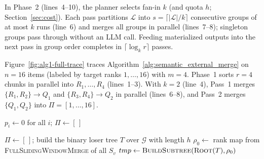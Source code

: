 In Phase~2 (lines~4--10), the planner selects fan-in $k$ (and quota $h$; Section~\ref{sec:cost}). Each pass partitions $\mathcal{L}$ into $s = \lceil |\mathcal{L}|/k \rceil$ consecutive groups of at most $k$ runs (line~6) and merges all groups in parallel (lines~7--8); singleton groups pass through without an LLM call. Feeding materialized outputs into the next pass in group order completes in $\lceil \log_k r \rceil$ passes.

\begin{example}\label{ex:alg1}
Figure~\ref{fig:alg1-full-trace} traces Algorithm~\ref{alg:semantic_external_merge} on $n{=}16$ items (labeled by target ranks $1,\dots,16$) with $m{=}4$. Phase~1 sorts $r{=}4$ chunks in parallel into $R_1,\dots,R_4$ (lines~1--3). With $k{=}2$ (line~4), Pass~1 merges $\{R_1,R_2\}\to Q_1$ and $\{R_3,R_4\}\to Q_2$ in parallel (lines~6--8), and Pass~2 merges $\{Q_1,Q_2\}$ into $\Pi=[1,\dots,16]$.
\end{example}

\suppressfloats[t]

\begin{algorithm}[t]
\caption{Sliding-Window Semantic $k$-Way Merge}
\label{alg:sliding_window_kway_group_merge}
$p_i\gets0$ for all $i$; $\Pi\gets[\,]$\;
\Return{$\Pi$}\;
\end{algorithm}

\begin{algorithm}[t]
\caption{Segmented Loser Tree Merge}
\label{alg:loser_tree_kway_group_merge}
$\Pi\gets[\,]$; build the binary loser tree $T$ over $\mathcal G$ with length $h$\;
$\rho_0\gets$ rank map from \textsc{FullSlidingWindowMerge} of all $S_v$\;
$tmp\gets\textsc{BuildSubtree}(\textsc{Root}(T),\rho_0)$\;
\Return{$\Pi$}\;
\end{algorithm}

